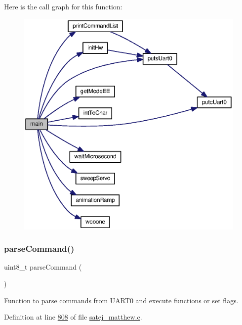 Here is the call graph for this function\+:
\nopagebreak
\begin{figure}[H]
\begin{center}
\leavevmode
\includegraphics[width=350pt]{satej__matthew_8c_a922afd31fa147cb51a9b28ce18b3e30e_cgraph}
\end{center}
\end{figure}
\mbox{\label{satej__matthew_8c_a784ef656236362513864c6ba3507e22d}} 
\subsubsection{\texorpdfstring{parseCommand()}{parseCommand()}}
{\footnotesize\ttfamily uint8\+\_\+t parse\+Command (\begin{DoxyParamCaption}{ }\end{DoxyParamCaption})}



Function to parse commands from U\+A\+R\+T0 and execute functions or set flags. 



Definition at line \mbox{\hyperlink{satej__matthew_8c_source_l00808}{808}} of file \mbox{\hyperlink{satej__matthew_8c_source}{satej\+\_\+matthew.\+c}}.

